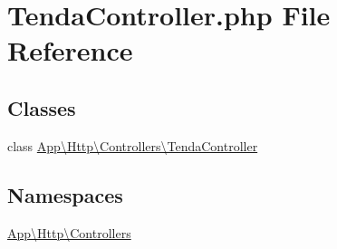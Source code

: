 \hypertarget{_tenda_controller_8php}{}\section{Tenda\+Controller.\+php File Reference}
\label{_tenda_controller_8php}
\subsection*{Classes}
\begin{DoxyCompactItemize}
\item 
class \mbox{\hyperlink{class_app_1_1_http_1_1_controllers_1_1_tenda_controller}{App\textbackslash{}\+Http\textbackslash{}\+Controllers\textbackslash{}\+Tenda\+Controller}}
\end{DoxyCompactItemize}
\subsection*{Namespaces}
\begin{DoxyCompactItemize}
\item 
 \mbox{\hyperlink{namespace_app_1_1_http_1_1_controllers}{App\textbackslash{}\+Http\textbackslash{}\+Controllers}}
\end{DoxyCompactItemize}
